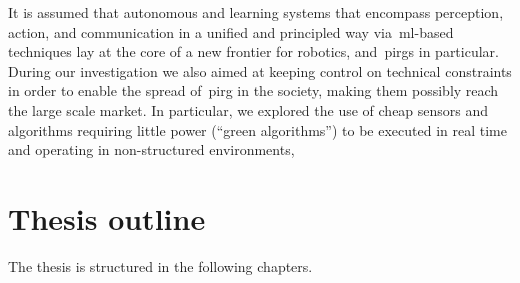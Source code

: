 It is assumed that autonomous and learning systems that encompass perception, action, and communication in a unified and principled way via~\gls{ml}-based techniques lay at the core of a new frontier for robotics, and~\gls{pirg}s in particular. During our investigation we also aimed at keeping control on technical constraints in order to enable the spread of~\gls{pirg} in the society, making them possibly reach the large scale market. In particular, we explored the use of cheap sensors and algorithms requiring little power (``green algorithms'') to be executed in real time and operating in non-structured environments, 

\section{Thesis outline}
The thesis is structured in the following chapters.

